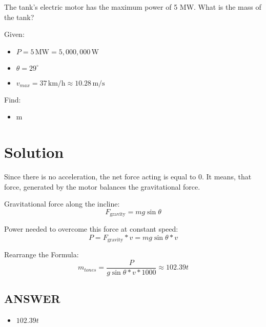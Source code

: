 The tank's electric motor has the maximum power of 5 MW.
What is the mass of the tank?

\bigbreak Given:
\begin{itemize}
    \item \( P = 5 \, \text{MW} = 5,000,000 \, \text{W} \)
    \item \( \theta = 29^\circ \)
    \item \( v_{max} = 37 \, \text{km/h} \approx 10.28 \, \text{m/s}\)
\end{itemize}

\bigbreak Find:
\begin{itemize}
    \item m
\end{itemize}

\section*{Solution}
Since there is no acceleration, the net force acting is equal to 0.
It means, that force, generated by the motor balances the gravitational force.

\bigbreak Gravitational force along the incline:
  \[
  F_{\text{gravity}} = m g \sin\theta
  \]
  
Power needed to overcome this force at constant speed:
  \[
  P = F_{\text{gravity}} * v = m g \sin\theta * v
  \]

Rearrange the Formula:
\[
m_{tones} = \frac{P}{g \sin\theta * v * 1000} \approx \boxed{102.39 t}
\]

\vfill \subsection*{ANSWER}
\begin{itemize}
    \item $102.39 t$
\end{itemize}
